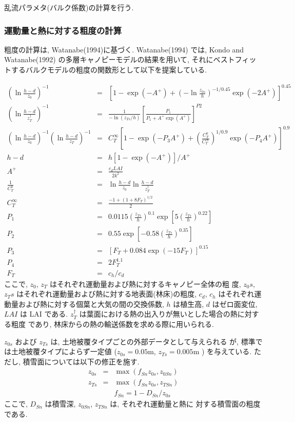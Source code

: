 乱流パラメタ(バルク係数)の計算を行う.

\subsubsection{運動量と熱に対する粗度の計算}

粗度の計算は, Watanabe(1994)に基づく. Watanabe(1994) では, Kondo and
Watanabe(1992) の多層キャノピーモデルの結果を用いて, それにベストフィッ
トするバルクモデルの粗度の関数形として以下を提案している.

\begin{eqnarray}
 \left(\ln \frac{h-d}{z_0}\right)^{-1} &=&
 \left[ 1 - \exp( -A^+) + \left(-\ln \frac{z_{0s}}{h}\right)^{-1/0.45}
  \exp(-2A^+)\right]^{0.45} \\
 \left(\ln \frac{h-d}{z_T^{\dagger}}\right)^{-1} &=&
 \frac{1}{-\ln(z_{Ts}/h)} \left[ \frac{P_1}{P_1 + A^+ \exp({A^+})}\right] ^{P2} \\
 \left(\ln \frac{h-d}{z_0}\right)^{-1} \left(\ln \frac{h-d}{z_T}\right)^{-1}
 &=& C_T^{\infty} \left[1-\exp(-P_3 A^+)
  + \left(\frac{C_T^0}{C_T^{\infty}}\right)^{1/0.9} \exp(-P_4 A^+)\right]^{0.9} \\
 h-d &=& h [1-\exp(-A^+)] / {A^+} \\
 A^+ &=& \frac{c_d LAI}{2k^2} \\
 \frac1{C_T^0} &=& \ln \frac{h-d}{z_0} \ln \frac{h-d}{z_T^{\dagger}} \\
 C_T^{\infty} &=& \frac{-1+(1+8F_T)^{1/2}}{2} \\
 P_1 &=& 0.0115 \left(\frac{z_{Ts}}{h}\right)^{0.1}
  \exp\left[5 \left(\frac{z_{Ts}}{h}\right)^{0.22}\right] \\
 P_2 &=& 0.55 \exp\left[-0.58 \left(\frac{z_{Ts}}{h}\right)^{0.35}\right] \\
 P_3 &=& [F_T + 0.084 \exp(-15 F_T)]^{0.15} \\
 P_4 &=& 2 F_T^{1.1} \\
 F_T &=& c_h / c_d
\end{eqnarray}
ここで, $z_0$, $z_T$ はそれぞれ運動量および熱に対するキャノピー全体の粗
度, $z_0s$, $z_Ts$ はそれぞれ運動量および熱に対する地表面(林床)の粗度,
$c_d$, $c_h$ はそれぞれ運動量および熱に対する個葉と大気の間の交換係数,
$h$ は植生高, $d$ はゼロ面変位, $LAI$ は LAI である.
$z_T^{\dagger}$ は葉面における熱の出入りが無いとした場合の熱に対する粗度
であり, 林床からの熱の輸送係数を求める際に用いられる.

$z_{0s}$ および $z_{Ts}$ は, 土地被覆タイプごとの外部データとして与えられる
が, 標準では土地被覆タイプによらず一定値 ($z_{0s}=0.05$m,
$z_{Ts}=0.005$m ) を与えている.
ただし, 積雪面については以下の修正を施す.
\begin{eqnarray}
 z_{0s} &=& \max( f_{Sn} z_{0s}, z_{0Sn} ) \\
 z_{Ts} &=& \max( f_{Sn} z_{0s}, z_{TSn} ) \\
        &&  f_{Sn} = 1 - D_{Sn} / z_{0s}
\end{eqnarray}
ここで, $D_{Sn}$ は積雪深, $z_{0Sn}$, $z_{TSn}$ は, それぞれ運動量と熱に
対する積雪面の粗度である.

